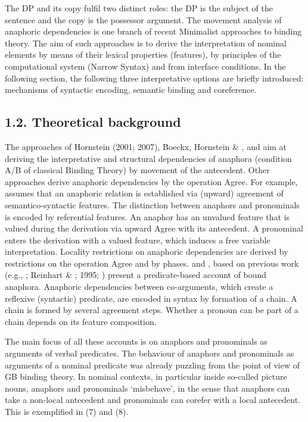 \documentclass[output=paper]{langsci/langscibook}
\begin{document}
The DP and its copy fulfil two distinct roles: the DP is the subject of the sentence and the copy is the possessor argument. The movement analysis of anaphoric dependencies is one branch of recent Minimalist approaches to binding theory. The aim of such approaches is to derive the interpretation of nominal elements by means of their lexical properties (features), by principles of the computational system (Narrow Syntax) and from interface conditions. In the following section, the following three interpretative options are briefly introduced: mechanisms of syntactic encoding, semantic binding and coreference.

\subsection{ 1.2. Theoretical background}

The approaches of Hornstein (2001; 2007), Boeckx, Hornstein \& \citet{Nunes2010}, \citet{Zwart2002} and \citet{Kayne2002} aim at deriving the interpretative and structural dependencies of anaphora (condition A/B of classical Binding Theory) by movement of the antecedent. Other approaches derive anaphoric dependencies by the operation Agree. For example, \citet{Hicks2009} assumes that an anaphoric relation is established via (upward) agreement of semantico-syntactic features. The distinction between anaphors and pronominals is encoded by referential features. An anaphor has an unvalued feature that is valued during the derivation via upward Agree with its antecedent. A pronominal enters the derivation with a valued feature, which induces a free variable interpretation. Locality restrictions on anaphoric dependencies are derived by restrictions on the operation Agree and by phases. \citet{Reinhart2006} and \citet{Reuland2011}, based on previous work (e.g., \citealt{Reinhart1983}; Reinhart \& \citealt{Reuland1993}; 1995; \citealt{Reuland2001}) present a predicate-based account of bound anaphora. Anaphoric dependencies between co-arguments, which create a reflexive (syntactic) predicate, are encoded in syntax by formation of a chain. A chain is formed by several agreement steps. Whether a pronoun can be part of a chain depends on its feature composition.

The main focus of all these accounts is on anaphors and pronominals as arguments of verbal predicates. The behaviour of anaphors and pronominals as arguments of a nominal predicate was already puzzling from the point of view of GB binding theory. In nominal contexts, in particular inside so-called picture nouns, anaphors and pronominals ‘misbehave’, in the sense that anaphors can take a non-local antecedent and pronominals can corefer with a local antecedent. This is exemplified in (7) and (8). 
\end{document}
